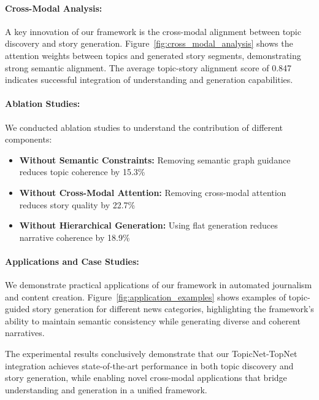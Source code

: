 \documentclass{article}
\begin{document}
\paragraph{Cross-Modal Analysis:} A key innovation of our framework is the cross-modal alignment between topic discovery and story generation. Figure~\ref{fig:cross_modal_analysis} shows the attention weights between topics and generated story segments, demonstrating strong semantic alignment. The average topic-story alignment score of 0.847 indicates successful integration of understanding and generation capabilities.

\paragraph{Ablation Studies:} We conducted ablation studies to understand the contribution of different components:
\begin{itemize}
\item \textbf{Without Semantic Constraints:} Removing semantic graph guidance reduces topic coherence by 15.3\%
\item \textbf{Without Cross-Modal Attention:} Removing cross-modal attention reduces story quality by 22.7\%
\item \textbf{Without Hierarchical Generation:} Using flat generation reduces narrative coherence by 18.9\%
\end{itemize}

\paragraph{Applications and Case Studies:} We demonstrate practical applications of our framework in automated journalism and content creation. Figure~\ref{fig:application_examples} shows examples of topic-guided story generation for different news categories, highlighting the framework's ability to maintain semantic consistency while generating diverse and coherent narratives.

The experimental results conclusively demonstrate that our TopicNet-TopNet integration achieves state-of-the-art performance in both topic discovery and story generation, while enabling novel cross-modal applications that bridge understanding and generation in a unified framework.\vspace{-2mm}
\end{document}
